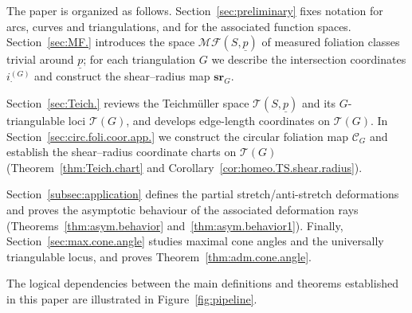 \documentclass[11pt, letterpaper]{amsart}
\theoremstyle{definition}
\theoremstyle{remark}
\newcommand{\up}{\underline{p}}
\newcommand{\cMFp}{\mathcal{MF} (S,\up)}
\newcommand{\cCG}{\mathcal{C}_{G}}
\newcommand{\cT}{\mathcal{T}}
\newcommand{\cTp}{\mathcal{T} (S,\up)}
\numberwithin{equation}{section}
\begin{document}
The paper is organized as follows.
Section~\ref{sec:preliminary} fixes notation for arcs, curves and triangulations, and for the associated function spaces.
Section~\ref{sec:MF.} introduces the space \(\cMFp\) of measured foliation classes trivial around \(\underline{p}\); for each triangulation \(G\) we describe the intersection coordinates \(i^{(G)}_{\cdot}\) and construct the shear--radius map \(\mathbf{sr}_G\).

Section~\ref{sec:Teich.} reviews the Teichm\"uller space \(\cTp\) and its \(G\)-triangulable loci \(\cT(G)\), and develops edge-length coordinates on \(\cT(G)\).
In Section~\ref{sec:circ.foli.coor.app.} we construct the circular foliation map \(\cCG\) and establish the shear--radius coordinate charts on \(\cT(G)\) (Theorem~\ref{thm:Teich.chart} and Corollary~\ref{cor:homeo.TS.shear.radius}).

Section~\ref{subsec:application} defines the partial stretch/anti-stretch deformations and proves the asymptotic behaviour of the associated deformation rays (Theorems~\ref{thm:asym.behavior} and~\ref{thm:asym.behavior1}).
Finally, Section~\ref{sec:max.cone.angle} studies maximal cone angles and the universally triangulable locus, and proves Theorem~\ref{thm:adm.cone.angle}.

The logical dependencies between the main definitions and theorems established in this paper are illustrated in Figure~\ref{fig:pipeline}.
\end{document}
